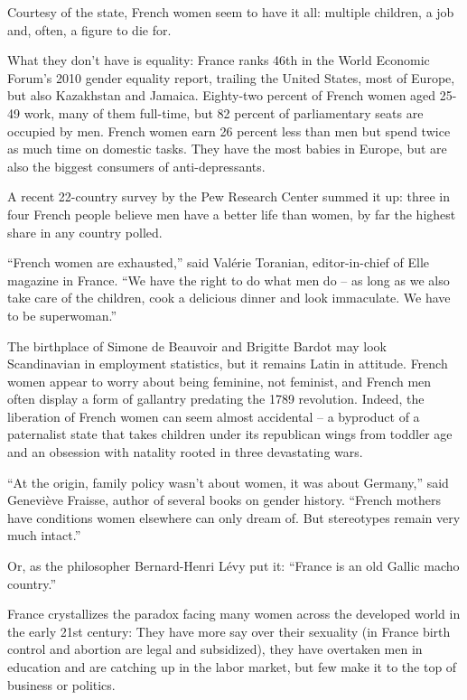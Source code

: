 ﻿\documentclass[12pt]{article}
\begin{document}
Courtesy of the state, French women seem to have it all: multiple children, a job and, often, a
figure to die for.

What they don't have is equality: France ranks 46th in the World Economic Forum's 2010 gender
equality report, trailing the United States, most of Europe, but also Kazakhstan and Jamaica.
Eighty-two percent of French women aged 25-49 work, many of them full-time, but 82 percent of
parliamentary seats are occupied by men. French women earn 26 percent less than men but spend twice
as much time on domestic tasks. They have the most babies in Europe, but are also the biggest
consumers of anti-depressants.

A recent 22-country survey by the Pew Research Center summed it up: three in four French people
believe men have a better life than women, by far the highest share in any country polled.

``French women are exhausted,'' said Val\'erie Toranian, editor-in-chief of Elle magazine in France.
``We have the right to do what men do -- as long as we also take care of the children, cook a
delicious dinner and look immaculate. We have to be superwoman.''

The birthplace of Simone de Beauvoir and Brigitte Bardot may look Scandinavian in employment
statistics, but it remains Latin in attitude. French women appear to worry about being feminine, not
feminist, and French men often display a form of gallantry predating the 1789 revolution. Indeed,
the liberation of French women can seem almost accidental -- a byproduct of a paternalist state that
takes children under its republican wings from toddler age and an obsession with natality rooted in
three devastating wars.

``At the origin, family policy wasn't about women, it was about Germany,'' said Genevi\`eve Fraisse,
author of several books on gender history. ``French mothers have conditions women elsewhere can only
dream of. But stereotypes remain very much intact.''

Or, as the philosopher Bernard-Henri L\'evy put it: ``France is an old Gallic macho country.''

France crystallizes the paradox facing many women across the developed world in the early 21st
century: They have more say over their sexuality (in France birth control and abortion are legal and
subsidized), they have overtaken men in education and are catching up in the labor market, but few
make it to the top of business or politics.
\end{document}
